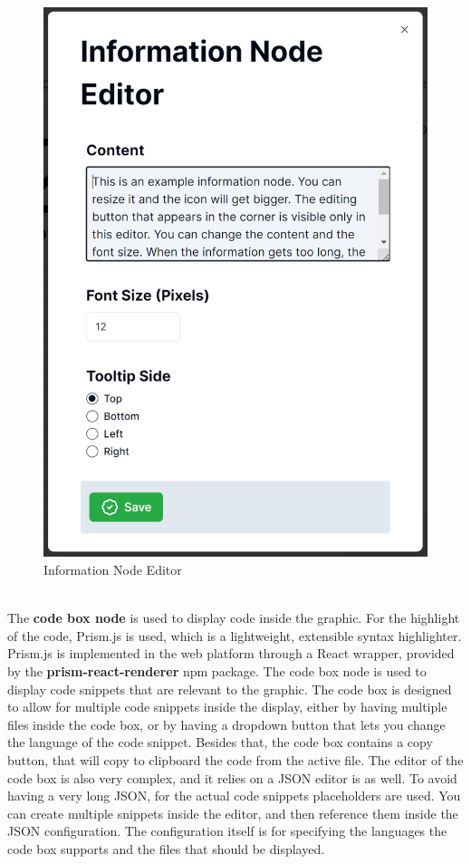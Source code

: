 \begin{figure}[hbt!]
\begin{minipage}{0.45\textwidth}
        \includegraphics[width=1\linewidth]{images/information-node-editor.png}
        \caption{Information Node Editor}
        \label{fig:information-node-editor}
    \end{minipage}
\end{figure}
\noindent \\
\noindent The \textbf{code box node} is used to display code inside the graphic. For the highlight of the code, Prism.js \cite{prismjs} is used, which is a lightweight, extensible syntax highlighter. Prism.js is implemented in the web platform through a React wrapper, provided by the \textbf{prism-react-renderer} npm package. The code box node is used to display code snippets that are relevant to the graphic. The code box is designed to allow for multiple code snippets inside the display, either by having multiple files inside the code box, or by having a dropdown button that lets you change the language of the code snippet. Besides that, the code box contains a copy button, that will copy to clipboard the code from the active file. The editor of the code box is also very complex, and it relies on a JSON editor is as well. To avoid having a very long JSON, for the actual code snippets placeholders are used. You can create multiple snippets inside the editor, and then reference them inside the JSON configuration. The configuration itself is for specifying the languages the code box supports and the files that should be displayed.

